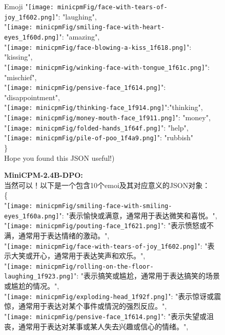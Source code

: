 \begin{figure}[]
{\begin{AIbox}{Emoji}
{{    "\texttt{[image: minicpmFig/face-with-tears-of-joy\_1f602.png]}": "laughing", \\
    "\texttt{[image: minicpmFig/smiling-face-with-heart-eyes\_1f60d.png]}": "amazing", \\
    "\texttt{[image: minicpmFig/face-blowing-a-kiss\_1f618.png]}": "kissing", \\
    "\texttt{[image: minicpmFig/winking-face-with-tongue\_1f61c.png]}": "mischief",\\
    "\texttt{[image: minicpmFig/pensive-face\_1f614.png]}": "disappointment", \\
    "\texttt{[image: minicpmFig/thinking-face\_1f914.png]}":"thinking", \\
    "\texttt{[image: minicpmFig/money-mouth-face\_1f911.png]}": "money",\\
    "\texttt{[image: minicpmFig/folded-hands\_1f64f.png]}": "help",\\
    "\texttt{[image: minicpmFig/pile-of-poo\_1f4a9.png]}": "rubbish"\\
    \} \\
    Hope you found this JSON useful!})
    }
    \hspace{0.02\linewidth}%
    \parbox[t]{0.49\linewidth}{{\bf MiniCPM-2.4B-DPO:} \\
    \scriptsize
    {当然可以！以下是一个包含10个emoi及其对应意义的JSON对象：\\
    \{\\
    "\texttt{[image: minicpmFig/smiling-face-with-smiling-eyes\_1f60a.png]}": "表示愉快或满意，通常用于表达微笑和喜悦。", \\
    "\texttt{[image: minicpmFig/pouting-face\_1f621.png]}": "表示愤怒或不满，通常用于表达情绪的激动。", \\
    "\texttt{[image: minicpmFig/face-with-tears-of-joy\_1f602.png]}": "表示大笑或开心，通常用于表达笑声和欢乐。", \\
    "\texttt{[image: minicpmFig/rolling-on-the-floor-laughing\_1f923.png]}": "表示搞笑或尴尬，通常用于表达搞笑的场景或尴尬的情况。", \\
    "\texttt{[image: minicpmFig/exploding-head\_1f92f.png]}": "表示惊讶或震惊，通常用于表达对某个事件或情況的强烈反应。",\\
    "\texttt{[image: minicpmFig/pensive-face\_1f614.png]}": "表示失望或沮丧，通常用于表达对某事或某人失去兴趣或信心的情绪。", \\
}}
\end{AIbox}}
\end{figure}
